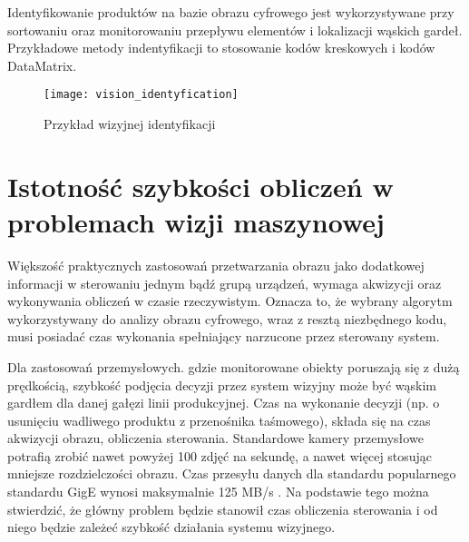\documentclass[document.tex]{subfiles}
\begin{document}
	\indent Identyfikowanie produktów na bazie obrazu cyfrowego jest wykorzystywane przy sortowaniu
	oraz monitorowaniu przepływu elementów i lokalizacji wąskich gardeł.
	Przykładowe metody indentyfikacji to stosowanie kodów kreskowych i kodów DataMatrix.\cite{Machine_Vision_Intro}
\\
\begin{center}
	\begin{figure}[h]
	\texttt{[image: vision\_identyfication]}
	\caption{Przykład wizyjnej identyfikacji\protect\cite{Machine_Vision_Intro}}
	\label{fig:identyfikacja}
	\end{figure}
\end{center}

\section{Istotność szybkości obliczeń w problemach wizji maszynowej}
\indent Większość praktycznych zastosowań przetwarzania obrazu jako dodatkowej 
informacji w sterowaniu jednym bądź grupą urządzeń, wymaga akwizycji oraz wykonywania
obliczeń w czasie rzeczywistym. Oznacza to, że wybrany algorytm wykorzystywany do 
analizy obrazu cyfrowego, wraz z resztą niezbędnego kodu, musi posiadać czas wykonania 
spełniający narzucone przez sterowany system.

\indent Dla zastosowań przemysłowych. gdzie monitorowane obiekty poruszają się z dużą prędkością, szybkość podjęcia decyzji przez system wizyjny
może być wąskim gardłem dla danej gałęzi linii produkcyjnej. Czas na wykonanie decyzji
(np. o usunięciu wadliwego produktu z przenośnika taśmowego), składa się na czas akwizycji obrazu,
obliczenia sterowania. Standardowe kamery przemysłowe potrafią zrobić nawet powyżej 100 zdjęć na sekundę, a nawet więcej stosując mniejsze rozdzielczości obrazu. Czas przesyłu danych dla
standardu popularnego standardu GigE wynosi maksymalnie 125 MB/s \cite{NI_camera_buses}. Na podstawie tego można stwierdzić, że główny problem będzie stanowił czas obliczenia sterowania i od niego będzie zależeć szybkość działania systemu wizyjnego\cite{Cognex_industrial_cameras}\cite{Basler_industrial_cameras}.
\end{document}
